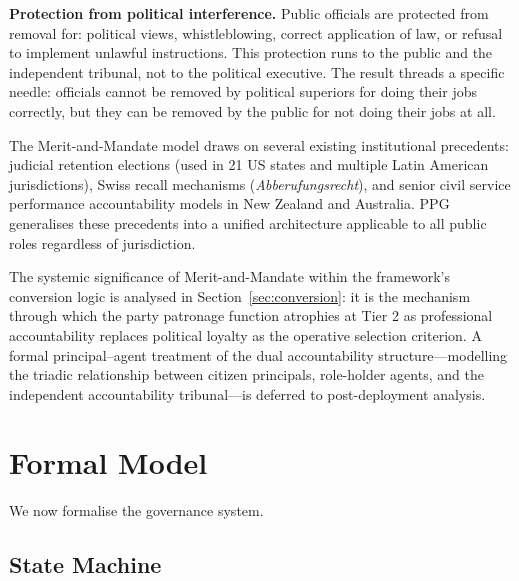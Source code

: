 \documentclass[12pt,a4paper,oneside]{report}
\begin{document}
\textbf{Protection from political interference.} Public officials are protected from removal for: political views, whistleblowing, correct application of law, or refusal to implement unlawful instructions. This protection runs to the public and the independent tribunal, not to the political executive. The result threads a specific needle: officials cannot be removed by political superiors for doing their jobs correctly, but they can be removed by the public for not doing their jobs at all.

The Merit-and-Mandate model draws on several existing institutional precedents: judicial retention elections (used in 21 US states and multiple Latin American jurisdictions), Swiss recall mechanisms (\textit{Abberufungsrecht}), and senior civil service performance accountability models in New Zealand and Australia. PPG generalises these precedents into a unified architecture applicable to all public roles regardless of jurisdiction.

The systemic significance of Merit-and-Mandate within the framework's conversion logic is analysed in Section~\ref{sec:conversion}: it is the mechanism through which the party patronage function atrophies at Tier 2 as professional accountability replaces political loyalty as the operative selection criterion. A formal principal--agent treatment of the dual accountability structure---modelling the triadic relationship between citizen principals, role-holder agents, and the independent accountability tribunal---is deferred to post-deployment analysis.

\chapter{Formal Model}
\label{sec:formal}

We now formalise the governance system.

\section{State Machine}
\end{document}
